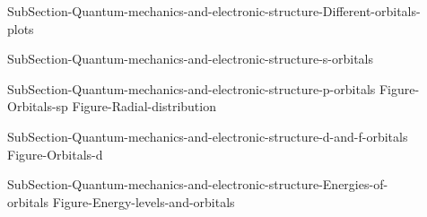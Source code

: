 \documentclass[main.tex]{subfiles}
\newcommand\chapterlabel{Ch-radiation}\setcounter{figurenewcounter}{0}\setcounter{tablenewcounter}{0}\setcounter{formulanewcounter}{0}
\begin{document}
\begin{description}
\item[] {SubSection-Quantum-mechanics-and-electronic-structure-Different-orbitals-plots}
\item[] {SubSection-Quantum-mechanics-and-electronic-structure-s-orbitals} 
\item[] {SubSection-Quantum-mechanics-and-electronic-structure-p-orbitals}
 {Figure-Orbitals-sp}
{Figure-Radial-distribution}

\item[] {SubSection-Quantum-mechanics-and-electronic-structure-d-and-f-orbitals}
{Figure-Orbitals-d}




 

\item[] {SubSection-Quantum-mechanics-and-electronic-structure-Energies-of-orbitals}
{Figure-Energy-levels-and-orbitals}

\end{description}
\end{document}
